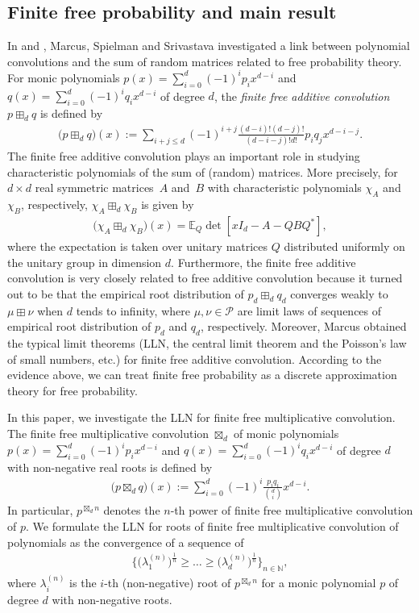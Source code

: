 \documentclass[pdftex]{sigma}
\numberwithin{equation}{section}
\newcommand{\N}{\mathbb{N}}   %
\newcommand{\calP}{\mathcal{P}}
\begin{document}
\subsection{Finite free probability and main result}

In \cite{Marcus} and \cite{MSS22}, Marcus, Spielman and Srivastava investigated a link between polynomial convolutions and the sum of random matrices related to free probability theory. For monic polynomials $p(x)=\sum_{i=0}^d (-1)^i p_i x^{d-i}$ and $q(x)=\sum_{i=0}^d (-1)^i q_i x^{d-i}$ of degree $d$, the {\it finite free additive convolution} $p\boxplus_d q$ is defined by
\begin{align*}
\big(p\boxplus_d q\big) (x):=\sum_{i+j\le d}(-1)^{i+j} \frac{(d-i)!(d-j)!}{(d-i-j)!d!}p_iq_j x^{d-i-j}.
\end{align*}
The finite free additive convolution plays an important role in studying characteristic polynomials of the sum of (random) matrices. More precisely, for $d\times d$ real symmetric matrices~$A$ and~$B$ with characteristic polynomials $\chi_A$ and $\chi_B$, respectively, $\chi_A\boxplus_d \chi_B$ is given by
\begin{align*}
\big(\chi_A\boxplus_d \chi_B\big)(x)=\mathbb{E}_Q \det[xI_d- A- QBQ^*],
\end{align*}
where the expectation is taken over unitary matrices $Q$ distributed uniformly on the unitary group in dimension $d$.
Furthermore, the finite free additive convolution is very closely related to free additive convolution because it turned out to be that the empirical root distribution of $p_d\boxplus_d q_d$ converges weakly to $\mu\boxplus \nu$ when $d$ tends to infinity, where $\mu,\nu\in \calP$ are limit laws of sequences of empirical root distribution of $p_d$ and $q_d$, respectively.
Moreover, Marcus \cite{Marcus} obtained the typical limit theorems (LLN, the central limit theorem and the Poisson's law of small numbers, etc.) for finite free additive convolution.
According to the evidence above, we can treat finite free probability as a discrete approximation theory for free probability.


In this paper, we investigate the LLN for finite free multiplicative convolution. The finite free multiplicative convolution $\boxtimes_d$ of monic polynomials $p(x)=\sum_{i=0}^d (-1)^i p_i x^{d-i}$ and $q(x)=\sum_{i=0}^d (-1)^i q_i x^{d-i}$ of degree $d$ with non-negative real roots is defined by
\begin{align*}
\big(p \boxtimes_d q\big)(x):=\sum_{i=0}^d (-1)^i\frac{p_iq_i}{\binom{d}{i}} x^{d-i}.
\end{align*}
In particular,  $p^{\boxtimes_dn}$ denotes the $n$-th power of finite free multiplicative convolution of $p$.
We formulate the LLN for roots of finite free multiplicative convolution of polynomials as the convergence of a sequence of
\begin{align}\label{eq:rootlimit}
\Big\{ \big(\lambda_{1}^{(n)}\big)^{\frac{1}{n}}  \ge \dots \ge \big(\lambda_{d}^{(n)}\big)^{\frac{1}{n}} \Big\}_{n \in \N},
\end{align}
where $\lambda_{i}^{(n)}$ is the $i$-th (non-negative) root of $p^{\boxtimes_dn}$ for a monic polynomial $p$ of degree $d$ with non-negative roots.
\end{document}
